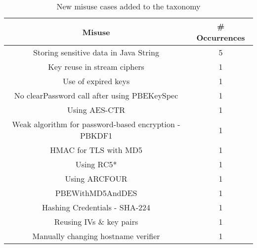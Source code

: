 \begin{table*}
    
    \centering
    \caption{\small New misuse cases added to the taxonomy}
    \label{table:new_misuse}
    \begin{tabular}{ |c|c| } 
     \hline
    Misuse & \# Occurrences \\
    \hline
    Storing sensitive data in Java String & 5 \\
    \hline
    Key reuse in stream ciphers & 1 \\
    \hline
    Use of expired keys & 1 \\
    \hline
    No clearPassword call after using PBEKeySpec & 1 \\
    \hline
    Using AES-CTR & 1 \\
    \hline
    Weak algorithm for password-based encryption - PBKDF1 & 1 \\
    \hline
    HMAC for TLS with MD5 & 1 \\
    \hline
    Using RC5* & 1 \\
    \hline
    Using ARCFOUR & 1 \\
    \hline
    PBEWithMD5AndDES & 1 \\
    \hline
    Hashing Credentials - SHA-224 & 1 \\
    \hline
    Reusing IVs \& key pairs & 1 \\
    \hline
    Manually changing hostname verifier & 1 \\
     \hline
    \end{tabular}
    \end{table*}
